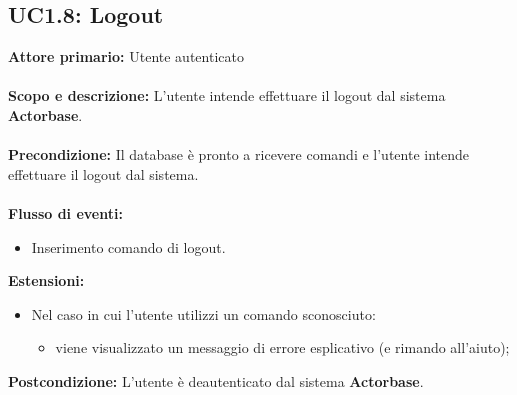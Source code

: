 \documentclass{scalatekids-article}
\begin{document}
\subsection{UC1.8: Logout}
\textbf{Attore primario:} Utente autenticato\\ \\
\textbf{Scopo e descrizione:} L'utente intende effettuare il logout dal sistema \textbf{Actorbase}.\\ \\
\textbf{Precondizione:} Il database è pronto a ricevere comandi e l'utente intende effettuare il logout dal sistema.\\ \\
\textbf{Flusso di eventi:}
\begin{itemize}
\item Inserimento comando di logout.
\end{itemize}
\textbf{Estensioni:}
\begin{itemize}
\item Nel caso in cui l'utente utilizzi un comando sconosciuto:
  \begin{itemize}
  \item viene visualizzato un messaggio di errore esplicativo (e rimando all'aiuto);
  \end{itemize}
\end{itemize}
\textbf{Postcondizione:} L'utente è deautenticato dal sistema \textbf{Actorbase}.
\end{document}
